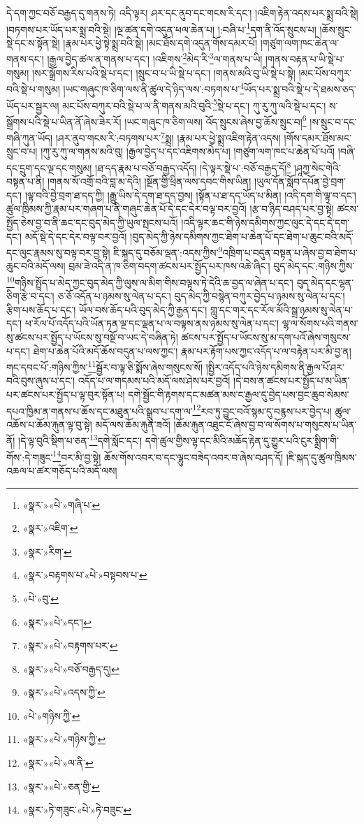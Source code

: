 དེ་དག་ཀྱང་བཅོ་བརྒྱད་དུ་གནས་ཏེ། འདི་ལྟར། ཤར་དང་ནུབ་དང་གངས་རི་དང་། །འཇིག་རྟེན་འདས་པར་སྨྲ་བའི་སྡེ། །བཏགས་པར་ཡོད་པར་སྨྲ་བའི་སྡེ། །ལྔ་ཚན་དགེ་འདུན་ཕལ་ཆེན་པ། །:བཞི་པ་\footnote{«སྣར་»«པེ་»གཞི་པ་}དག་ནི་འོད་སྲུངས་པ། །ཆོས་སྲུང་སྡེ་དང་ས་སྟོན་སྡེ། །རྣམ་པར་ཕྱེ་སྟེ་སྨྲ་བའི་སྡེ། །མང་ཐོས་དགེ་འདུན་གོས་དམར་པོ། །གཙུག་ལག་ཁང་ཆེན་ལ་གནས་དང་། །རྒྱལ་བྱེད་ཚལ་ན་གནས་པ་དང་། །འཇིགས་\footnote{«སྣར་»འཇིག་}མེད་རི་\footnote{«སྣར་»རིག་}ལ་གནས་པ་ཡི། །གནས་བརྟན་པ་ཡི་སྡེ་པ་གསུམ། །སར་སྒྲོགས་རིས་པའི་སྡེ་པ་དང་། །སྲུང་བ་པ་ཡི་སྡེ་པ་དང་། །གནས་མའི་བུ་ཡི་སྡེ་པ་སྟེ། །མང་པོས་བཀུར་བའི་སྡེ་པ་གསུམ། །ཡང་གཞུང་ཁ་ཅིག་ལས་ནི་ཚུལ་དེ་ཉིད་ལས་:བཏགས་པ་\footnote{«སྣར་»བརྟགས་པ་«པེ་»བསྟབས་པ་}ཡོད་པར་སྨྲ་བའི་སྡེ་པ་དེ་ཐམས་ཅད་ཡོད་པར་སྦྱར་ལ། མང་པོས་བཀུར་བའི་སྡེ་པ་ལ་ནི་གནས་མའི་བུའི་\footnote{«པེ་»བུ་}སྡེ་པ་དང་། ཀུ་རུ་ཀུ་ལའི་སྡེ་པ་དང་། ས་སྒྲོགས་པའི་སྡེ་པ་ཡིན་ནོ་ཞེས་ཟེར་རོ། །ཡང་གཞུང་ཁ་ཅིག་ལས། འོད་སྲུངས་ཞེས་བྱ་ཆོས་སྲུང་བ།\footnote{«སྣར་»«པེ་»དང་།} །ས་སྲུང་བ་དང་གཞི་ཀུན་ཡོད། །ཤར་ནུབ་གངས་རི་:བཏགས་པར་\footnote{«སྣར་»«པེ་»བརྟགས་པར་}སྨྲ། །རྣམ་པར་ཕྱེ་སྨྲ་འཇིག་རྟེན་འདས། །གོས་དམར་ཐོས་མང་སྲུང་བ་པ། །ཀུ་རུ་ཀུ་ལ་གནས་མའི་བུ། །རྒྱལ་བྱེད་པ་དང་འཇིགས་མེད་པ། །གཙུག་ལག་ཁང་པ་ཆེན་པོ་པའོ། །བཞི་དང་དྲུག་དང་ལྔ་དང་གསུམ། །ཐ་དད་རྣམ་པ་བཅོ་བརྒྱད་འདོད། །དེ་ལྟར་སྡེ་པ་:བཅོ་བརྒྱད་དོ།\footnote{«སྣར་»«པེ་»བཅོ་བརྒྱད་དུ།} །ཤཱཀྱ་སེང་གེའི་བསྟན་པ་ནི། །གནས་སོ་འགྲོ་བའི་བླ་མ་དེའི། །སྔོན་གྱི་ཕྲིན་ལས་དབང་གིས་ཡིན། །ཡུལ་དོན་སློབ་དཔོན་བྱེ་བྲག་དང་། །ལྟ་བའི་བྱེ་བྲག་ཐ་དད་ཀྱི། །རྒྱུ་ཡིས་དེ་དག་ཐ་དད་བྱས། །སྟོན་པ་ཐ་དད་ཡོད་པ་མིན། །འདི་དག་གི་ལྟ་བ་དང་། ཚུལ་ཁྲིམས་ཀྱི་རྣམ་པར་གཞག་པ་ནི་གཞུང་ཆེན་པོ་དེ་དང་དེར་བལྟ་བར་བྱའོ། །རྩ་བ་ཉིད་བཤད་པར་བྱ་སྟེ། ཚངས་སྤྱོད་ཅེས་བྱ་བ་ནི་ཆང་དང་བུད་མེད་ཀྱི་ཡུལ་སྤངས་པའོ། །འདི་ལྟར་ཆང་གི་ཉེས་དམིགས་ཀྱང་ལུང་དེ་དང་དེ་དག་དང་། མདོ་སྡེ་དེ་དང་དེར་བལྟ་བར་བྱའོ། །བུད་མེད་ཀྱི་ཉེས་དམིགས་ཀྱང་ཐེག་པ་ཆེན་པོ་དང་ཐེག་པ་ཆུང་བའི་མདོ་དང་ལུང་རྣམས་སུ་བལྟ་བར་བྱ་སྟེ། ཇི་སྐད་དུ་བཅོམ་ལྡན་:འདས་ཀྱིས་\footnote{«སྣར་»«པེ་»འདས་ཀྱི་}འཁྲིག་པ་བདུན་བསྟན་པ་ཞེས་བྱ་བ་ཐེག་པ་ཆུང་བའི་མདོ་ལས། བྲམ་ཟེ་འདི་ན་ཁ་ཅིག་བདག་ཚངས་པར་སྤྱོད་པར་ཁས་འཆེ་ཞིང་། བུད་མེད་དང་:གཉིས་ཀྱིས་\footnote{«པེ་»གཉིས་ཀྱི་}གཉིས་སྤྲོད་པ་མེད་ཀྱང་བུད་མེད་ཀྱི་ལུས་ལ་མིག་གིས་བལྟས་ཏེ་དེའི་ཆ་བྱད་ལ་ཞེན་པ་དང་། བུད་མེད་དང་ལྷན་ཅིག་རྩེ་བ་དང་། ཅ་ཅོ་འདོན་པ་ཉམས་སུ་ལེན་པ་དང་། བུད་མེད་ཀྱི་བསྙེན་བཀུར་བྱེད་པ་ཉམས་སུ་ལེན་པ་དང་། རྩིག་པས་ཆོད་པ་དང་། ཡོལ་བས་ཆོད་པའི་བུད་མེད་ཀྱི་རྒྱན་དང་། གླུ་དང་གར་དང་རོལ་མོའི་སྒྲ་ཉམས་སུ་ལེན་པ་དང་། ཕ་རོལ་པོ་འདོད་པའི་ཡོན་ཏན་ལྔ་དང་ལྡན་པ་ལ་བལྟས་ནས་ཉམས་སུ་ལེན་པ་དང་། ལྷ་ལ་སོགས་པའི་གནས་སུ་ཚངས་པར་སྤྱོད་པ་ཡོངས་སུ་བསྔོ་བ་ཡང་དེ་བཞིན་ཏེ། ཚངས་པར་སྤྱོད་པ་ཡོངས་སུ་མ་དག་པའོ་ཞེས་གསུངས་པ་དང་། ཐེག་པ་ཆེན་པོའི་མདོ་ཆོས་བདུན་པ་ལས་ཀྱང་། རྣམ་པར་རྟོག་པས་ཀྱང་འདོད་པ་ལ་བརྟེན་པར་མི་བྱ་ན། གང་དབང་པོ་:གཉིས་ཀྱིས་\footnote{«སྣར་»«པེ་»གཉིས་ཀྱི་}སྦྱོར་བ་ལྟ་ཅི་སྨོས་ཞེས་གསུངས་སོ། །སྤྱིར་འདོད་པའི་ཉེས་དམིགས་ནི་རྒྱལ་པོ་ཤར་བའི་བུས་ཞུས་པ་དང་། འདོད་པ་ལ་གདམས་པའི་མདོ་ལས་ཤེས་པར་བྱའོ། །དེ་བས་ན་ཚངས་པར་སྤྱོད་པ་མ་ཡིན་པར་ཚངས་པར་སྤྱོད་པ་ལྟ་བུར་སྟོན་པ། དགེ་སྦྱོང་གི་རྟགས་དང་མཚན་མས་ང་རྒྱལ་དུ་བྱེད་པས་བྱང་ཆུབ་སེམས་དཔའ་ཁྱིམ་ན་གནས་པ་ཆོས་དང་མཐུན་པའི་སྒྲུབ་པ་དག་ལ་\footnote{«སྣར་»«པེ་»ལ་ནི་}རབ་ཏུ་བྱུང་བའོ་སྙམ་དུ་བརྙས་པར་བྱེད་པ། ཚུལ་འཆོས་པ་ཆོམ་རྐུན་ལྟ་བུ་སྟེ། མདོ་ལས་ཆོམ་རྐུན་ཟའོ། །ཆོམ་རྐུན་འཐུང་ངོ་ཞེས་བྱ་བ་ལ་སོགས་པ་གསུངས་པ་ཡིན་ནོ། །དེ་ལྟ་བུའི་སྡིག་པ་ཅན་\footnote{«སྣར་»«པེ་»ཅན་གྱི་}དགེ་སློང་དང་། དགེ་ཚུལ་གྱིས་ལྷ་དང་མིའི་མཆོད་རྟེན་དུ་གྱུར་པའི་ངུར་སྨྲིག་གི་གོས་:དེ་གཟུང་\footnote{«སྣར་»ཏེ་གཟུང་«པེ་»ཏེ་བཟུང་}བར་མི་བྱ་སྟེ། ཆོས་གོས་འབར་བ་དང་ལྷུང་བཟེད་འབར་བ་ཞེས་བཤད་དོ། །ཇི་སྐད་དུ་ཚུལ་ཁྲིམས་འཆལ་པ་ཚར་གཅོད་པའི་མདོ་ལས། 